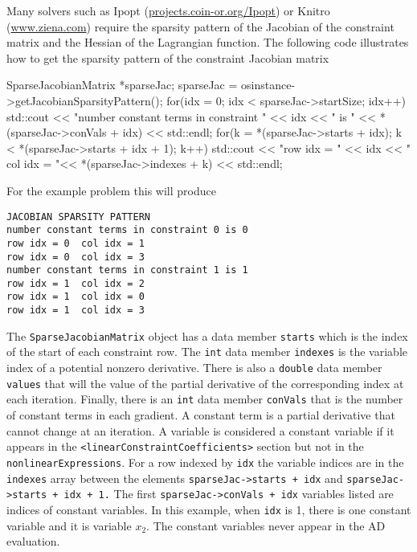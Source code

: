 \documentclass[11pt]{article}
\renewcommand{\_}{{\char"5F}}
\renewcommand{\{}{{\char"7B}}
\renewcommand{\}}{{\char"7D}}
\renewcommand{\^}{{\char"0D}}
\renewcommand{\'}{{\char"0D}}
\begin{document}
Many  solvers such as Ipopt (\url{projects.coin-or.org/Ipopt}) or Knitro (\url{www.ziena.com}) require the sparsity pattern of the Jacobian of the constraint matrix and the Hessian of the Lagrangian function. The following code illustrates how to get the sparsity pattern of the constraint Jacobian matrix
\begin{verbatimtab}[4]
SparseJacobianMatrix *sparseJac;
sparseJac = osinstance->getJacobianSparsityPattern();
for(idx = 0; idx < sparseJac->startSize; idx++){
	std::cout << "number constant terms in constraint "   <<  idx << " is " 
	<< *(sparseJac->conVals + idx)  << std::endl;
	for(k = *(sparseJac->starts + idx); k < *(sparseJac->starts + idx + 1); k++){
		std::cout << "row idx = " << idx <<  "  
		col idx = "<< *(sparseJac->indexes + k) << std::endl;
	}
}
\end{verbatimtab}
For the example problem this will produce
\begin{verbatim}
JACOBIAN SPARSITY PATTERN
number constant terms in constraint 0 is 0
row idx = 0  col idx = 1
row idx = 0  col idx = 3
number constant terms in constraint 1 is 1
row idx = 1  col idx = 2
row idx = 1  col idx = 0
row idx = 1  col idx = 3
\end{verbatim}
The {\tt SparseJacobianMatrix} object has a data member {\tt starts} which is the index of the start of each constraint row. The {\tt int} data member {\tt indexes} is the variable index of a potential nonzero derivative. There is also a {\tt double} data member  {\tt values} that will the value of the partial derivative of the corresponding index at each iteration. Finally, there is an {\tt int} data member {\tt conVals} that is the number of constant terms in each gradient. A constant term is a partial derivative that cannot change at an iteration.  A variable is considered a constant variable if it appears in the {\tt <linearConstraintCoefficients>} section  but not in the {\tt nonlinearExpressions}.  For a row indexed by {\tt idx} the variable indices are in the  {\tt indexes} array between the elements {\tt sparseJac->starts + idx} and {\tt sparseJac->starts + idx + 1.}   The first  {\tt sparseJac->conVals + idx} variables listed are indices of constant variables. In this example, when {\tt idx} is 1, there is one constant variable and it is variable $x_{2}.$  The constant variables never appear in the AD evaluation. 
\end{document}
